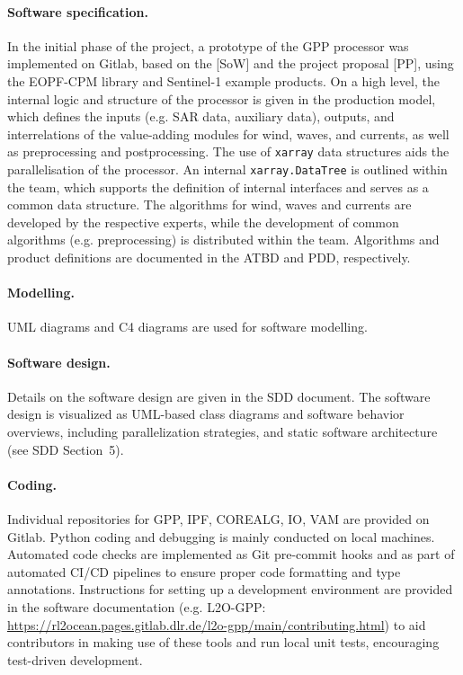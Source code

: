 \paragraph*{Software specification.} In the initial phase of the project, a prototype of the GPP processor was implemented on Gitlab, based on the [SoW] and the project proposal [PP], using the EOPF-CPM library and Sentinel-1 example products. On a high level, the internal logic and structure of the processor is given in the production model, which defines the inputs (e.g. SAR data, auxiliary data), outputs, and interrelations of the value-adding modules for wind, waves, and currents, as well as preprocessing and postprocessing. The use of \texttt{xarray} data structures aids the parallelisation of the processor. An internal \texttt{xarray.DataTree} is outlined within the team, which supports the definition of internal interfaces and serves as a common data structure. The algorithms for wind, waves and currents are developed by the respective experts, while the development of common algorithms (e.g. preprocessing) is distributed within the team. Algorithms and product definitions are documented in the ATBD and PDD, respectively.

\paragraph*{Modelling.} UML diagrams and C4 diagrams are used for software modelling.
    
\paragraph*{Software design.} Details on the software design are given in the SDD document. The software design is visualized as UML-based class diagrams and software behavior overviews, including parallelization strategies, and static software architecture (see SDD Section~5).

\paragraph*{Coding.} Individual repositories for GPP, IPF, COREALG, IO, VAM are provided on Gitlab. Python coding and debugging is mainly conducted on local machines. Automated code checks are implemented as Git pre-commit hooks and as part of automated CI/CD pipelines to ensure proper code formatting and type annotations. Instructions for setting up a development environment are provided in the software documentation (e.g. L2O-GPP: \url{https://rl2ocean.pages.gitlab.dlr.de/l2o-gpp/main/contributing.html}) to aid contributors in making use of these tools and run local unit tests, encouraging test-driven development.

